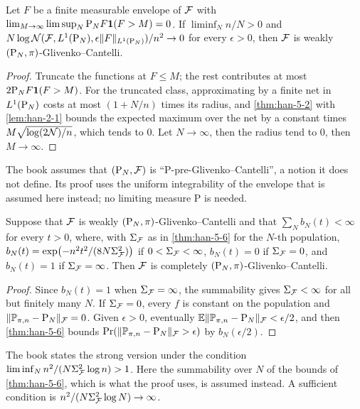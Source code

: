\begin{theorem}
  \label{thm:han-5-10}
  Let $F$ be a finite measurable envelope of $\mathcal{F}$ with $\lim_{M\to\infty}\limsup_N\mathrm{P}_N F\mathbf{1}(F>M)=0$. If $\liminf_Nn/N>0$ and $N\log\mathcal{N}(\mathcal{F},L^1(\mathrm{P}_N),\epsilon\|F\|_{L^1(\mathrm{P}_N)})/n^2\to0$ for every $\epsilon>0$, then $\mathcal{F}$ is weakly $(\mathrm{P}_N,\pi)$-Glivenko--Cantelli.
\end{theorem}
\begin{proof}
  Truncate the functions at $F\le M$; the rest contributes at most $2\mathrm{P}_N F\mathbf{1}(F>M)$. For the truncated class, approximating by a finite net in $L^1(\mathrm{P}_N)$ costs at most $(1+N/n)$ times its radius, and \cref{thm:han-5-2} with \cref{lem:han-2-1} bounds the expected maximum over the net by a constant times $M\sqrt{\log(2\mathcal{N})/n}$, which tends to $0$. Let $N\to\infty$, then the radius tend to $0$, then $M\to\infty$.
\end{proof}
\begin{remark}
  The book assumes that $(\mathrm{P}_N,\mathcal{F})$ is ``$\mathrm P$-pre-Glivenko--Cantelli'', a notion it does not define. Its proof uses the uniform integrability of the envelope that is assumed here instead; no limiting measure $\mathrm P$ is needed.
\end{remark}

\begin{theorem}
  \label{thm:han-5-11}
  Suppose that $\mathcal{F}$ is weakly $(\mathrm{P}_N,\pi)$-Glivenko--Cantelli and that $\sum_Nb_N(t)<\infty$ for every $t>0$, where, with $\Sigma_{\mathcal{F}}$ as in \cref{thm:han-5-6} for the $N$-th population, $b_N(t)=\exp\bigl(-n^2t^2/(8N\Sigma_{\mathcal{F}}^2)\bigr)$ if $0<\Sigma_{\mathcal{F}}<\infty$, $b_N(t)=0$ if $\Sigma_{\mathcal{F}}=0$, and $b_N(t)=1$ if $\Sigma_{\mathcal{F}}=\infty$. Then $\mathcal{F}$ is completely $(\mathrm{P}_N,\pi)$-Glivenko--Cantelli.
\end{theorem}
\begin{proof}
  Since $b_N(t)=1$ when $\Sigma_{\mathcal{F}}=\infty$, the summability gives $\Sigma_{\mathcal{F}}<\infty$ for all but finitely many $N$. If $\Sigma_{\mathcal{F}}=0$, every $f$ is constant on the population and $\|\mathbb{P}_{\pi,n}-\mathrm{P}_N\|_{\mathcal{F}}=0$. Given $\epsilon>0$, eventually $\mathbb{E}\|\mathbb{P}_{\pi,n}-\mathrm{P}_N\|_{\mathcal{F}}<\epsilon/2$, and then \cref{thm:han-5-6} bounds $\Pr(\|\mathbb{P}_{\pi,n}-\mathrm{P}_N\|_{\mathcal{F}}>\epsilon)$ by $b_N(\epsilon/2)$.
\end{proof}
\begin{remark}
  The book states the strong version under the condition $\liminf_Nn^2/(N\Sigma_{\mathcal{F}}^2\log n)>1$. Here the summability over $N$ of the bounds of \cref{thm:han-5-6}, which is what the proof uses, is assumed instead. A sufficient condition is $n^2/(N\Sigma_{\mathcal{F}}^2\log N)\to\infty$.
\end{remark}

